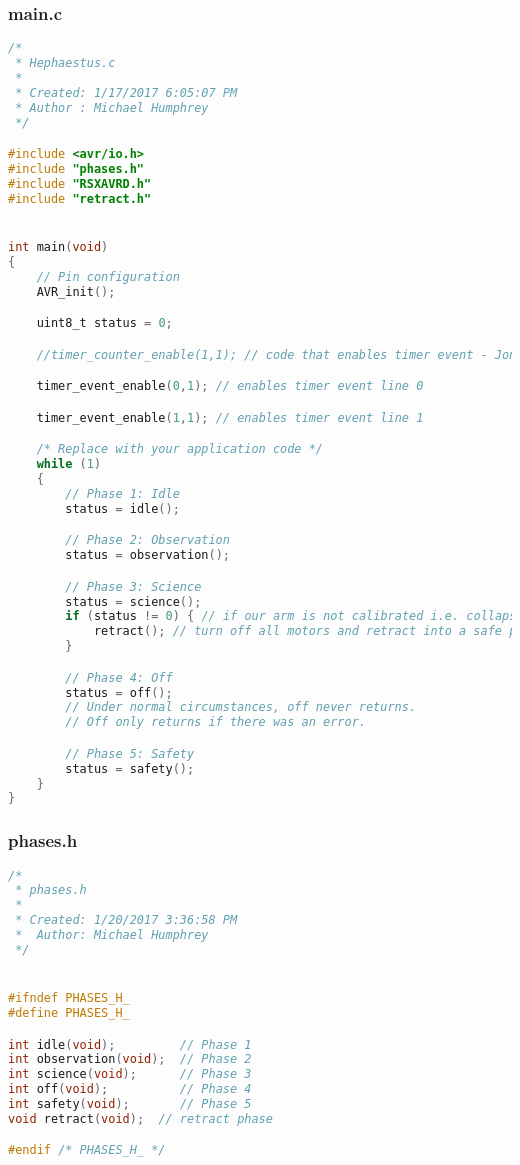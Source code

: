 \subsubsection{main.c}
\begin{lstlisting}[language=C]
/*
 * Hephaestus.c
 *
 * Created: 1/17/2017 6:05:07 PM
 * Author : Michael Humphrey
 */ 

#include <avr/io.h>
#include "phases.h"
#include "RSXAVRD.h"
#include "retract.h"


int main(void)
{
	// Pin configuration
	AVR_init();

	uint8_t status = 0;

	//timer_counter_enable(1,1); // code that enables timer event - Jon says Michael wanted this?

	timer_event_enable(0,1); // enables timer event line 0

	timer_event_enable(1,1); // enables timer event line 1

    /* Replace with your application code */
    while (1) 
    {
		// Phase 1: Idle
		status = idle();

		// Phase 2: Observation
		status = observation();

		// Phase 3: Science
		status = science();
		if (status != 0) { // if our arm is not calibrated i.e. collapsed and in home position...
			retract(); // turn off all motors and retract into a safe position
		}

		// Phase 4: Off
		status = off();
		// Under normal circumstances, off never returns.
		// Off only returns if there was an error.

		// Phase 5: Safety
		status = safety();
    }
}
\end{lstlisting}

\subsubsection{phases.h}
\begin{lstlisting}[language=C]
/*
 * phases.h
 *
 * Created: 1/20/2017 3:36:58 PM
 *  Author: Michael Humphrey
 */ 


#ifndef PHASES_H_
#define PHASES_H_

int idle(void);			// Phase 1
int observation(void);	// Phase 2
int science(void);		// Phase 3
int off(void);			// Phase 4
int safety(void);		// Phase 5
void retract(void);  // retract phase

#endif /* PHASES_H_ */
\end{lstlisting}

